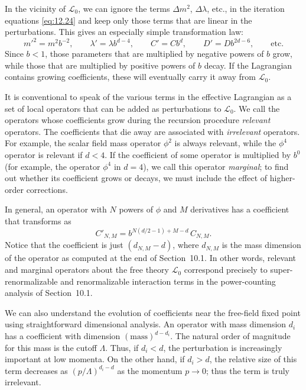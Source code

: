 In the vicinity of $\mathcal{L}_0$, we can ignore the terms $\Delta m^2$,
$\Delta\lambda$, etc., in the iteration equations \eqref{eq:12.24} and keep
only those terms that are linear in the perturbations.  This gives an
especially simple transformation law:
\begin{equation}
  m'^2 = m^2b^{-2},\qquad \lambda' = \lambda b^{d-4},\qquad C' = Cb^d,\qquad
  D' = Db^{2d-6},\qquad \text{etc.}
  \label{eq:12.26}
\end{equation}
Since $b < 1$, those parameters that are multiplied by negative powers of $b$
grow, while those that are multiplied by positive powers of $b$ decay.  If the
Lagrangian contains growing coefficients, these will eventually carry it away
from $\mathcal{L}_0$.

It is conventional to speak of the various terms in the effective Lagrangian
as a set of local operators that can be added as perturbations to
$\mathcal{L}_0$.  We call the operators whose coefficients grow during the
recursion procedure \emph{relevant} operators.  The coefficients that die
away are associated with \emph{irrelevant} operators.  For example, the
scalar field mass operator $\phi^2$ is always relevant, while the $\phi^4$
operator is relevant if $d < 4$.  If the coefficient of some operator is
multiplied by $b^0$ (for example, the operator $\phi^4$ in $d = 4$), we call
this operator \emph{marginal}; to find out whether its coefficient grows or
decays, we must include the effect of higher-order corrections.

In general, an operator with $N$ powers of $\phi$ and $M$ derivatives has a
coefficient that transforms as
\begin{equation}
  C'_{N,M} = b^{N(d/2-1)+M-d}\,C_{N,M} .
  \label{eq:12.27}
\end{equation}
Notice that the coefficient is just $(d_{N,M}-d)$, where $d_{N,M}$ is the
mass dimension of the operator as computed at the end of Section~10.1.  In
other words, relevant and marginal operators about the free theory
$\mathcal{L}_0$ correspond precisely to super-renormalizable and
renormalizable interaction terms in the power-counting analysis of
Section~10.1.

We can also understand the evolution of coefficients near the free-field fixed
point using straightforward dimensional analysis.  An operator with mass
dimension $d_i$ has a coefficient with dimension $(\mathrm{mass})^{d-d_i}$.
The natural order of magnitude for this mass is the cutoff $\Lambda$.  Thus,
if $d_i < d$, the perturbation is increasingly important at low momenta.  On
the other hand, if $d_i > d$, the relative size of this term decreases as
$(p/\Lambda)^{d_i-d}$ as the momentum $p\to 0$; thus the term is truly
irrelevant.

